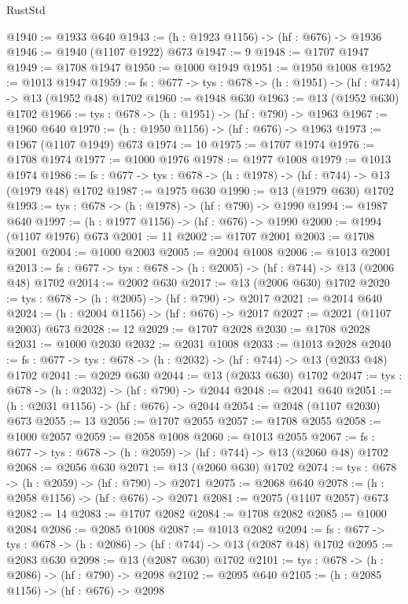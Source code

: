 \begin{lexlean}{RustStd}
\begin{coremodule}
@1940 := @1933 @640
@1943 := (h : @1923 @1156) -> (hf : @676) -> @1936
@1946 := @1940 (@1107 @1922) @673
@1947 := 9
@1948 := @1707 @1947
@1949 := @1708 @1947
@1950 := @1000 @1949
@1951 := @1950 @1008
@1952 := @1013 @1947
@1959 := {fs : @677} -> {tys : @678} -> (h : @1951) -> (hf : @744) -> @13 (@1952 @48) @1702
@1960 := @1948 @630
@1963 := @13 (@1952 @630) @1702
@1966 := {tys : @678} -> (h : @1951) -> (hf : @790) -> @1963
@1967 := @1960 @640
@1970 := (h : @1950 @1156) -> (hf : @676) -> @1963
@1973 := @1967 (@1107 @1949) @673
@1974 := 10
@1975 := @1707 @1974
@1976 := @1708 @1974
@1977 := @1000 @1976
@1978 := @1977 @1008
@1979 := @1013 @1974
@1986 := {fs : @677} -> {tys : @678} -> (h : @1978) -> (hf : @744) -> @13 (@1979 @48) @1702
@1987 := @1975 @630
@1990 := @13 (@1979 @630) @1702
@1993 := {tys : @678} -> (h : @1978) -> (hf : @790) -> @1990
@1994 := @1987 @640
@1997 := (h : @1977 @1156) -> (hf : @676) -> @1990
@2000 := @1994 (@1107 @1976) @673
@2001 := 11
@2002 := @1707 @2001
@2003 := @1708 @2001
@2004 := @1000 @2003
@2005 := @2004 @1008
@2006 := @1013 @2001
@2013 := {fs : @677} -> {tys : @678} -> (h : @2005) -> (hf : @744) -> @13 (@2006 @48) @1702
@2014 := @2002 @630
@2017 := @13 (@2006 @630) @1702
@2020 := {tys : @678} -> (h : @2005) -> (hf : @790) -> @2017
@2021 := @2014 @640
@2024 := (h : @2004 @1156) -> (hf : @676) -> @2017
@2027 := @2021 (@1107 @2003) @673
@2028 := 12
@2029 := @1707 @2028
@2030 := @1708 @2028
@2031 := @1000 @2030
@2032 := @2031 @1008
@2033 := @1013 @2028
@2040 := {fs : @677} -> {tys : @678} -> (h : @2032) -> (hf : @744) -> @13 (@2033 @48) @1702
@2041 := @2029 @630
@2044 := @13 (@2033 @630) @1702
@2047 := {tys : @678} -> (h : @2032) -> (hf : @790) -> @2044
@2048 := @2041 @640
@2051 := (h : @2031 @1156) -> (hf : @676) -> @2044
@2054 := @2048 (@1107 @2030) @673
@2055 := 13
@2056 := @1707 @2055
@2057 := @1708 @2055
@2058 := @1000 @2057
@2059 := @2058 @1008
@2060 := @1013 @2055
@2067 := {fs : @677} -> {tys : @678} -> (h : @2059) -> (hf : @744) -> @13 (@2060 @48) @1702
@2068 := @2056 @630
@2071 := @13 (@2060 @630) @1702
@2074 := {tys : @678} -> (h : @2059) -> (hf : @790) -> @2071
@2075 := @2068 @640
@2078 := (h : @2058 @1156) -> (hf : @676) -> @2071
@2081 := @2075 (@1107 @2057) @673
@2082 := 14
@2083 := @1707 @2082
@2084 := @1708 @2082
@2085 := @1000 @2084
@2086 := @2085 @1008
@2087 := @1013 @2082
@2094 := {fs : @677} -> {tys : @678} -> (h : @2086) -> (hf : @744) -> @13 (@2087 @48) @1702
@2095 := @2083 @630
@2098 := @13 (@2087 @630) @1702
@2101 := {tys : @678} -> (h : @2086) -> (hf : @790) -> @2098
@2102 := @2095 @640
@2105 := (h : @2085 @1156) -> (hf : @676) -> @2098

\end{coremodule}
\end{lexlean}
